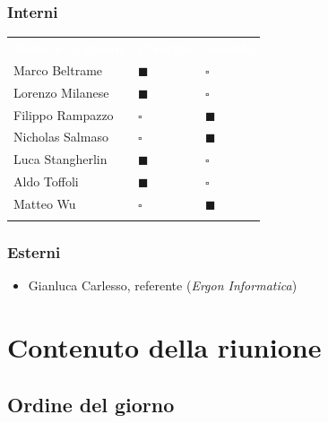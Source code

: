 \documentclass[12pt,a4paper]{article}
\newcommand{\tightlist}{\setlength{\itemsep}{1pt}\setlength{\parskip}{0pt}}
\begin{document}
\hypertarget{interni}{%
\subsubsection{Interni}}

\begin{center}
\begin{tabularx}{\linewidth}{>{\raggedright\arraybackslash}X>{\centering\arraybackslash}p{2.5cm}>{\centering\arraybackslash}p{2.5cm}}
\rowcolor{bfblue}\textcolor{white}{\textbf{Nome e Cognome}} & \textcolor{white}{\textbf{Presente}} & \textcolor{white}{\textbf{Assente}} \\
Marco Beltrame & $\blacksquare$ & $\square$ \\ \arrayrulecolor{bfline}\hline
Lorenzo Milanese & $\blacksquare$ & $\square$ \\ \arrayrulecolor{bfline}\hline
Filippo Rampazzo & $\square$ & $\blacksquare$ \\ \arrayrulecolor{bfline}\hline
Nicholas Salmaso & $\square$ & $\blacksquare$ \\ \arrayrulecolor{bfline}\hline
Luca Stangherlin & $\blacksquare$ & $\square$ \\ \arrayrulecolor{bfline}\hline
Aldo Toffoli & $\blacksquare$ & $\square$ \\ \arrayrulecolor{bfline}\hline
Matteo Wu & $\square$ & $\blacksquare$ \\ \arrayrulecolor{bfline}\hline
\end{tabularx}
\end{center}

\hypertarget{esterni}{%
\subsubsection{Esterni}}

\begin{itemize}
\tightlist
\item
  Gianluca Carlesso, referente (\emph{Ergon Informatica})
\end{itemize}

\hypertarget{contenuto-della-riunione}{%
\section{Contenuto della riunione}}

\hypertarget{ordine-del-giorno}{%
\subsection{Ordine del giorno}}
\end{document}
